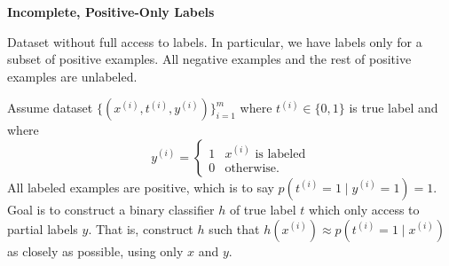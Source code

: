 \documentclass[12pt,letterpaper,boxed]{hmcpset}
\newcommand{\yy}{y^{(i)}}
\newcommand{\xx}{x^{(i)}}
\renewcommand{\tt}{t^{(i)}}
\begin{document}
\begin{problem}[Problem 2]
	\textbf{Incomplete, Positive-Only Labels}
	
	Dataset without full access to labels. In particular, we have labels only for a subset of positive examples. All negative examples and the rest of positive examples are unlabeled.
	
	Assume dataset $\{ (\xx, \tt, \yy) \}_{i=1}^m$ where $\tt \in \{0,1\}$ is true label and where 
	\[
	\yy = \begin{cases}
		1 & \xx \text{ is labeled}\\
		0 & \text{otherwise.}
	\end{cases}
	\]
	All labeled examples are positive, which is to say $p(\tt = 1 \mid \yy = 1) = 1$. Goal is to construct a binary classifier $h$ of true label $t$ which only access to partial labels $y$. That is, construct $h$ such that $h(\xx) \approx p(\tt = 1 \mid \xx)$ as closely as possible, using only $x$ and $y$.
\end{problem}
\end{document}
